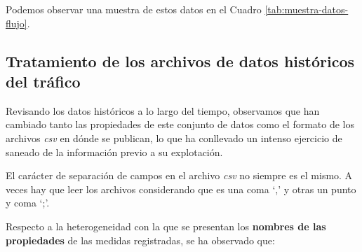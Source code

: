 \documentclass[]{book}
\begin{document}
Podemos observar una muestra de estos datos en el Cuadro
\ref{tab:muestra-datos-flujo}.

\begin{table}[!h]

\caption{\label{tab:muestra-datos-flujo}Muestra de datos históricos de flujo de tráfico (Septiembre 2018)}
\centering
{}
\end{table}

\subsection{Tratamiento de los archivos de datos históricos del
tráfico}\label{tratamiento-de-los-archivos-de-datos-historicos-del-trafico}

Revisando los datos históricos a lo largo del tiempo, observamos que han
cambiado tanto las propiedades de este conjunto de datos como el formato
de los archivos \emph{csv} en dónde se publican, lo que ha conllevado un
intenso ejercicio de saneado de la información previo a su explotación.

El carácter de separación de campos en el archivo \emph{csv} no siempre
es el mismo. A veces hay que leer los archivos considerando que es una
coma `,' y otras un punto y coma `;'.

Respecto a la heterogeneidad con la que se presentan los \textbf{nombres
de las propiedades} de las medidas registradas, se ha observado que:
\end{document}
